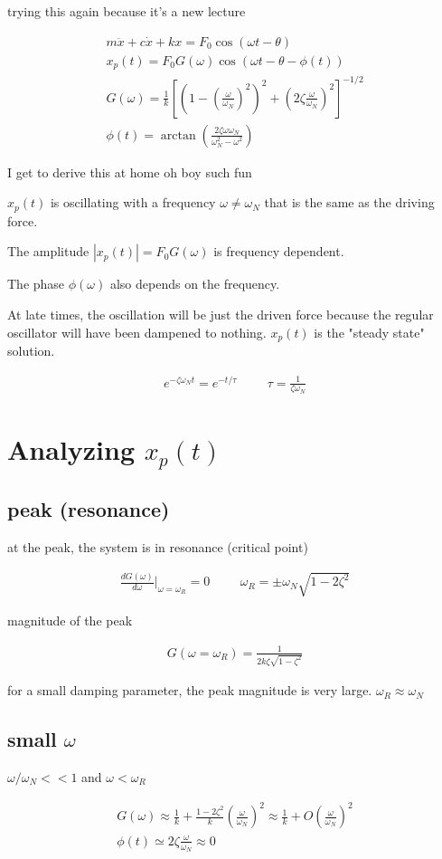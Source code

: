 \documentclass[fleqn]{report}
\newcommand{\hp}{\hspace{1cm}}
\newcommand{\equations} [1] {
\begin{gather*}
#1
\end{gather*}
}
\begin{document}
trying this again because it's a new lecture 

\equations{
    m \ddot x + c \dot x + k x = F_0 \cos(\omega t - \theta)
    \\
    x_p(t) = F_0 G(\omega) \cos(\omega t - \theta - \phi(t))
    \\
    G(\omega) = 
    \frac{1}{k}
    \left[
        \left(
            1 - (\frac{\omega}{\omega_N})^2
        \right)^2
        +
        \left(
            2 \zeta \frac{\omega}{\omega_N}
        \right)^2
    \right]^{-1/2}
    \\
    \phi(t) = \arctan(\frac{2 \zeta \omega \omega_N}{\omega_N^2 - \omega^2})
}
I get to derive this at home oh boy such fun 

$x_p(t)$ is oscillating with a frequency $\omega \neq \omega_N$ 
that is the same as the driving force.

The amplitude $|x_p(t)| = F_0 G(\omega)$ is frequency dependent. 

The phase $\phi(\omega)$ also depends on the frequency. 

At late times, the oscillation will be just the driven force because the 
regular oscillator will have been dampened to nothing. $x_p(t)$ is the 
"steady state" solution. 
\equations{
    e^{- \zeta \omega_N t} = e^{- t / \tau} 
    \hp
    \tau = \frac{1}{\zeta \omega_N}
}

\section{Analyzing $x_p(t)$}

\subsection{peak (resonance)}
at the peak, the system is in resonance (critical point)
\equations{
    \frac{d G(\omega)}{d \omega} \Big|_{\omega = \omega_R} = 0
    \hp 
    \omega_R = \pm \omega_N \sqrt{1 - 2 \zeta^2}
}

magnitude of the peak 
\equations{
    G(\omega = \omega_R) = \frac{1}{2k \zeta \sqrt{1- \zeta^2}}
}
for a small damping parameter, the peak magnitude is very large. $\omega_R \approx \omega_N$

\subsection{small $\omega$}
$\omega / \omega_N << 1$ and $\omega < \omega_R$
\equations{
    G(\omega) \approx \frac{1}{k} + 
    \frac{1 - 2 \zeta^2}{k} \left( \frac{\omega}{\omega_N} \right)^2
    \approx 
    \frac{1}{k} + O (\frac{\omega}{\omega_N})^2
    \\
    \phi(t) \simeq 2 \zeta \frac{\omega}{\omega_N} \approx 0
}
\end{document}
